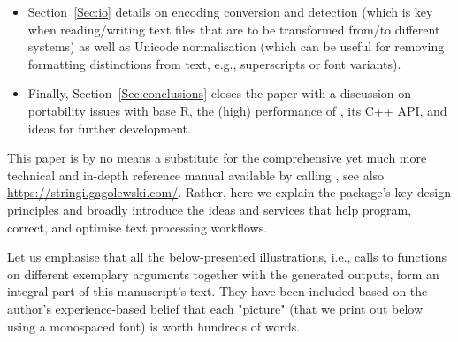 \documentclass[nojss]{jss}\usepackage[]{graphicx}\usepackage[]{color}
\begin{document}
\begin{itemize}
\item Section~\ref{Sec:io} details on encoding conversion and detection
(which is key when reading/writing text files that are to be transformed from/to
different systems)
as well as Unicode normalisation (which can be useful for removing formatting
distinctions from text, e.g., superscripts or font variants).

\item Finally, Section~\ref{Sec:conclusions} closes the paper
with a discussion on portability issues with base R,
the (high) performance of , its C++ API, and
ideas for further development.
\end{itemize}



This paper is by no means a substitute for the comprehensive yet much more technical
and in-depth reference manual available by calling ,
see also \url{https://stringi.gagolewski.com/}.
Rather, here we explain the package's key design principles and broadly
introduce the ideas and services that help program, correct, and optimise text processing workflows.

Let us emphasise that all the below-presented illustrations,
i.e., calls to  functions on different
exemplary arguments together with the generated outputs, form an integral
part of this manuscript's text. They have been included based on
the author's experience-based belief that each "picture" (that we print
out below using a monospaced font) is worth hundreds of words.














%
%
%
%
%
%
\end{document}
